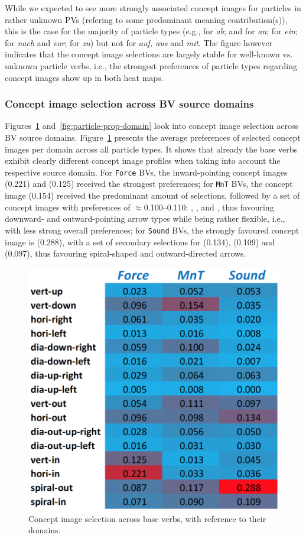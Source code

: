 \documentclass[output=paper]{langsci/langscibook}
\begin{document}
While we expected to see more strongly associated concept images for
particles in rather unknown PVs (refering to some predominant meaning
contribution(s)), this is the case for the majority of particle types
(e.g.,  for \textit{ab}; 
and  for \textit{an};  for
\textit{ein};  for \textit{nach} and \textit{vor};
 for \textit{zu}) but not for \textit{auf, aus} and
\textit{mit}. The figure however indicates that the concept image
selections are largely stable for well-known vs. unknown particle
verbs, i.e., the strongest preferences of particle types regarding
concept images show up in both heat maps.


\subsubsection{Concept image selection across BV source domains}

Figures~\ref{fig:BV-prop-domain} and~\ref{fig:particle-prop-domain}
look into concept image selection across BV source
domains. Figure~\ref{fig:BV-prop-domain} presents the average
preferences of selected concept images per domain across all particle
types. It shows that already the base verbs exhibit clearly different
concept image profiles when taking into account the respective source
domain. For \texttt{Force} BVs, the inward-pointing concept images
 (0.221) and  (0.125) received the
strongest preferences; for \texttt{MnT} BVs, the concept image
 (0.154) received the predominant amount of
selections, followed by a set of concept images with preferences of
$\approx$0.100--0.110: , ,
 and , thus favouring
downward- and outward-pointing arrow types while being rather
flexible, i.e., with less strong overall preferences; for
\texttt{Sound} BVs, the strongly favoured concept image is
 (0.288), with a set of secondary selections for
 (0.134),  (0.109) and
 (0.097), thus favouring spiral-shaped and
outward-directed arrows.

\begin{figure}[htbp]
  \caption{Concept image selection across base verbs, with reference to their domains.}
  \label{fig:BV-prop-domain}
  \includegraphics[width=0.55\linewidth]{figures/dataset_particles_domains_BVs}
\end{figure}
\end{document}
